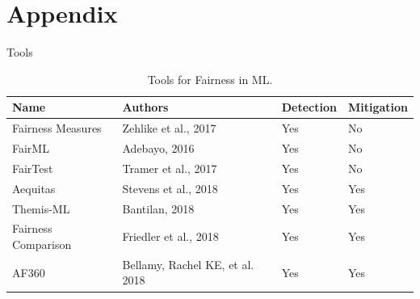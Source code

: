 \documentclass[10pt, xcolor=table,aspectratio=169]{beamer}
\begin{document}
\section{Appendix}
\label{app}
\begin{frame}{Tools}
	\begin{table}[]
		\begin{tabular}{|l|l|l|l|}
			\hline
			Name                & Authors                         & Detection & Mitigation \\ \hline
			Fairness Measures   & Zehlike et al., 2017            & Yes       & No         \\ \hline
			FairML              & Adebayo, 2016                   & Yes       & No         \\ \hline
			FairTest            & Tramer et al., 2017             & Yes       & No         \\ \hline
			Aequitas            & Stevens et al., 2018            & Yes       & Yes        \\ \hline
			Themis-ML           & Bantilan, 2018                  & Yes       & Yes        \\ \hline
			Fairness Comparison & Friedler et al., 2018           & Yes       & Yes        \\ \hline
			AF360               & Bellamy, Rachel KE, et al. 2018 & Yes       & Yes        \\ \hline
		\end{tabular}
		\caption{Tools for Fairness in ML.}
	\end{table}
\end{frame}
\end{document}
